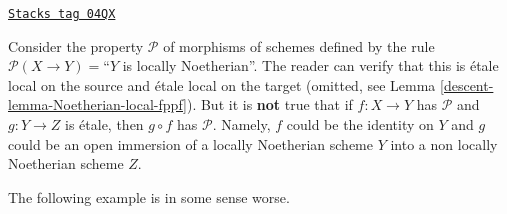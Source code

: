 \begin{example}
\label{descent-example-silly-one}
\href{https://stacks.math.columbia.edu/tag/04QX}{\texttt{Stacks tag 04QX}}

Consider the property $\mathcal{P}$ of morphisms of schemes defined
by the rule $\mathcal{P}(X \to Y) = $``$Y$ is locally Noetherian''.
The reader can verify that this is \'etale local on the source and
\'etale local on the target (omitted, see
Lemma \ref{descent-lemma-Noetherian-local-fppf}).
But it is {\bf not} true that if $f : X \to Y$ has $\mathcal{P}$
and $g : Y \to Z$ is \'etale, then $g \circ f$ has $\mathcal{P}$.
Namely, $f$ could be the identity on $Y$ and $g$ could be an open
immersion of a locally Noetherian scheme $Y$ into a non locally Noetherian
scheme $Z$.
\end{example}

The following example is in some sense worse.

